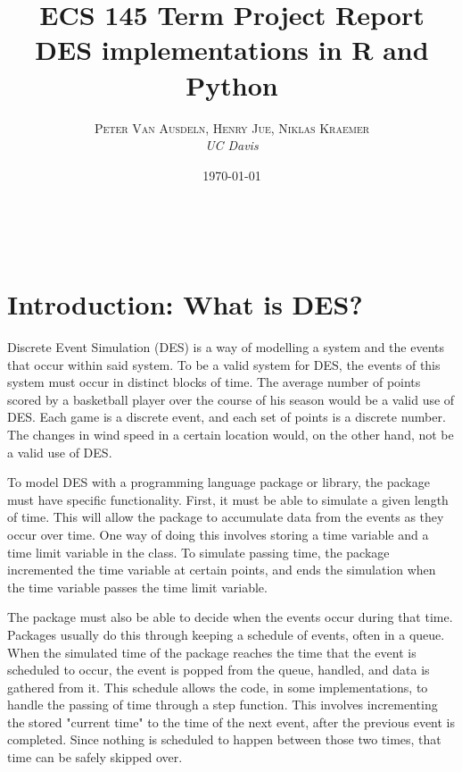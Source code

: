 \documentclass[a4paper, 11pt]{article} %
\title{\textbf{ECS 145 Term Project Report}\\ %
DES implementations in R and Python} %
\author{\textsc{Peter Van Ausdeln, Henry Jue, Niklas Kraemer} %
\\{\textit{UC Davis}}} %
\date{\today} %
\makeatletter
\renewcommand{\maketitle}{ %
\begin{flushright} %
{\LARGE\@title} %

\vspace{30pt} %

{\large\@author} %
\\\@date %

\vspace{30pt} %
\end{flushright}
}
\makeatother
\begin{document}
\maketitle %



\section*{Introduction: What is DES?}

Discrete Event Simulation (DES) is a way of modelling a system and the events that occur within said system. To be a valid system for DES, the events of this system must occur in distinct blocks of time. The average number of points scored by a basketball player over the course of his season would be a valid use of DES. Each game is a discrete event, and each set of points is a discrete number. The changes in wind speed in a certain location would, on the other hand, not be a valid use of DES.


To model DES with a programming language package or library, the package must have specific functionality. First, it must be able to simulate a given length of time. This will allow the package to accumulate data from the events as they occur over time. One way of doing this involves storing a time variable and a time limit variable in the class. To simulate passing time, the package incremented the time variable at certain points, and ends the simulation when the time variable passes the time limit variable.


The package must also be able to decide when the events occur during that time. Packages usually do this through keeping a schedule of events, often in a queue. When the simulated time of the package reaches the time that the event is scheduled to occur, the event is popped from the queue, handled, and data is gathered from it. This schedule allows the code, in some implementations, to handle the passing of time through a step function. This involves incrementing the stored "current time" to the time of the next event, after the previous event is completed. Since nothing is scheduled to happen between those two times, that time can be safely skipped over.
\end{document}
